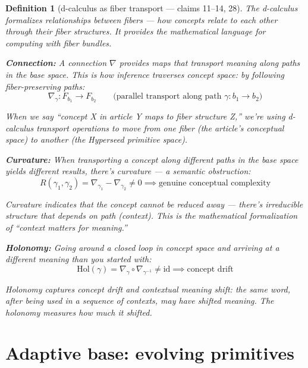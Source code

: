 \documentclass[11pt,a4paper]{article}
\newtheorem{definition}{Definition}[section]
\begin{document}
\begin{definition}[d-calculus as fiber transport --- claims 11--14, 28]
\label{def:dcalculus}
The d-calculus formalizes relationships between fibers --- how concepts
relate to each other through their fiber structures. It provides the
mathematical language for computing with fiber bundles.

\textbf{Connection:} A connection $\nabla$ provides maps that transport
meaning along paths in the base space. This is how inference traverses
concept space: by following fiber-preserving paths:
\[
  \nabla_\gamma: F_{b_1} \to F_{b_2} \qquad
  \text{(parallel transport along path } \gamma: b_1 \to b_2\text{)}
\]

When we say ``concept X in article Y maps to fiber structure Z,'' we're
using d-calculus transport operations to move from one fiber (the
article's conceptual space) to another (the Hyperseed primitive space).

\textbf{Curvature:} When transporting a concept along different paths
in the base space yields different results, there's curvature --- a
semantic obstruction:
\[
  R(\gamma_1, \gamma_2) = \nabla_{\gamma_1} - \nabla_{\gamma_2}
  \neq 0 \implies \text{genuine conceptual complexity}
\]

Curvature indicates that the concept cannot be reduced away --- there's
irreducible structure that depends on path (context). This is the
mathematical formalization of ``context matters for meaning.''

\textbf{Holonomy:} Going around a closed loop in concept space and
arriving at a different meaning than you started with:
\[
  \text{Hol}(\gamma) = \nabla_\gamma \circ \nabla_{\gamma^{-1}} \neq
  \text{id} \implies \text{concept drift}
\]

Holonomy captures concept drift and contextual meaning shift: the
same word, after being used in a sequence of contexts, may have shifted
meaning. The holonomy measures how much it shifted.
\end{definition}

\section{Adaptive base: evolving primitives}
\label{sec:adaptive}
\end{document}
